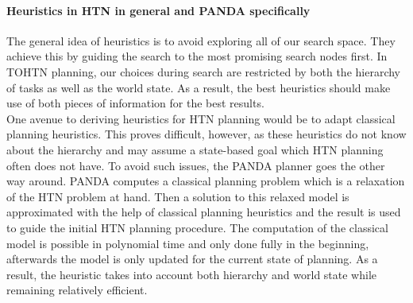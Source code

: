 \paragraph{Heuristics in HTN in general and PANDA specifically}
\label{improv: crowd heuristic}
The general idea of heuristics is to avoid exploring all of our search space. They achieve this by guiding the search to the most promising search nodes first.
In TOHTN planning, our choices during search are restricted by both the hierarchy of tasks as well as the world state. As a result, the best heuristics should make use of both pieces of information for the best results. \\
One avenue to deriving heuristics for HTN planning would be to adapt classical planning heuristics. This proves difficult, however, as these heuristics do not know about the hierarchy and may assume a state-based goal which HTN planning often does not have. To avoid such issues, the PANDA planner goes the other way around. PANDA computes a classical planning problem which is a relaxation of the HTN problem at hand. Then a solution to this relaxed model is approximated with the help of classical planning heuristics and the result is used to guide the initial HTN planning procedure. The computation of the classical model is possible in polynomial time and only done fully in the beginning, afterwards the model is only updated for the current state of planning. As a result, the heuristic takes into account both hierarchy and world state while remaining relatively efficient.

